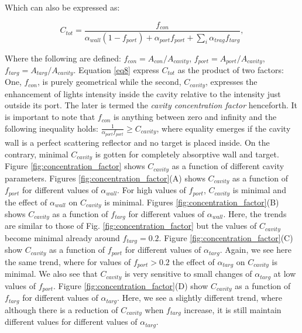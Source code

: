 \documentclass[a4paper]{article}
\begin{document}
\noindent Which can also be expressed as:

\begin{equation}\label{eq8}
C_{tot} = \frac{f_{con}}{\alpha_{wall}(1-f_{port}) + \alpha_{port}f_{port} + \sum_{i}\alpha_{trag}f_{targ}},
\end{equation}

\noindent Where the following are defined: $f_{con}=A_{con}/A_{cavity}$, $f_{port}=A_{port}/A_{cavity}$, $f_{targ}=A_{targ}/A_{cavity}$. Equation \ref{eq8} express $C_{tot}$ as the product of two factors: One, $f_{con}$, is purely geometrical while the  second, $C_{cavity}$, expresses the enhancement of lights intensity inside the cavity relative to the intensity just outside its port. The later is termed the \emph{cavity concentration factor} henceforth. It is important to note that $f_{con}$ is anything between zero and infinity and the following inequality holds: $\frac{1}{\alpha_{port}f_{port}}\geq C_{cavity}$, where equality emerges if the cavity wall is a perfect scattering reflector and no target is placed inside. On the contrary, minimal $C_{cavity}$ is gotten for completely absorptive wall and target. Figure \ref{fig:concentration_factor} shows $C_{cavity}$ as a function of different cavity parameters. Figures \ref{fig:concentration_factor}(A) shows $C_{cavity}$ as a function of $f_{port}$ for different values of $\alpha_{wall}$. For high values of $f_{port}$, $C_{cavity}$ is minimal and the effect of $\alpha_{wall}$ on $C_{cavity}$ is minimal. Figures \ref{fig:concentration_factor}(B) shows $C_{cavity}$ as a function of $f_{targ}$ for different values of $\alpha_{wall}$. Here, the trends are similar to those of Fig. \ref{fig:concentration_factor} but the values of $C_{cavity}$ become minimal already around $f_{targ}=0.2$. Figure \ref{fig:concentration_factor}(C) show $C_{cavity}$ as a function of $f_{port}$ for different values of $\alpha_{targ}$. Again, we see here the same trend, where for values of $f_{port}>0.2$ the effect of $\alpha_{targ}$ on $C_{cavity}$ is minimal. We also see that $C_{cavity}$ is very sensitive to small changes of $\alpha_{targ}$ at low values of $f_{port}$. Figure \ref{fig:concentration_factor}(D) show $C_{cavity}$ as a function of $f_{targ}$ for different values of $\alpha_{targ}$. Here, we see a slightly different trend, where although there is a reduction of $C_{cavity}$ when $f_{targ}$ increase, it is still maintain different values for different values of $\alpha_{targ}$. 
\end{document}
